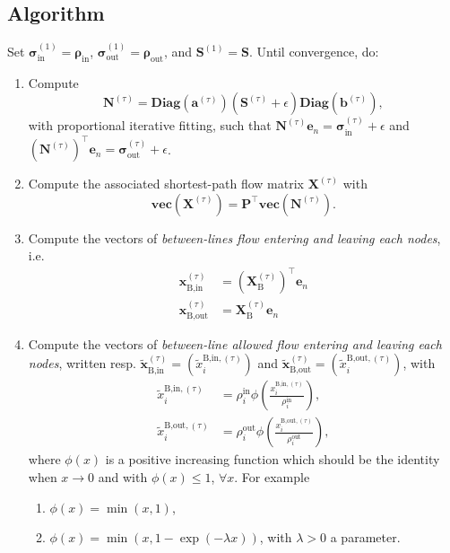 \documentclass[11p]{article}
\begin{document}
\subsection{Algorithm}
Set $\bm{\sigma}^{(1)}_\text{in} = \bm{\rho}_\text{in}$, $\bm{\sigma}^{(1)}_\text{out} = \bm{\rho}_\text{out}$, and $\mathbf{S}^{(1)} = \mathbf{S}$. Until convergence, do:
\begin{enumerate}
	\item Compute 
	\begin{equation}
		\mathbf{N}^{(\tau)} = \textbf{Diag}(\mathbf{a}^{(\tau)}) (\mathbf{S}^{(\tau)} + \epsilon)\textbf{Diag}(\mathbf{b}^{(\tau)}),
	\end{equation}
	with proportional iterative fitting, such that $\mathbf{N}^{(\tau)} \mathbf{e}_n = \bm{\sigma}^{(\tau)}_\text{in} + \epsilon$ and $\left(\mathbf{N}^{(\tau)}\right)^\top \mathbf{e}_n = \bm{\sigma}^{(\tau)}_\text{out}  + \epsilon$.
	
	\item Compute the associated shortest-path flow matrix $\mathbf{X}^{(\tau)}$ with
	\begin{equation}
		\textbf{vec}(\mathbf{X}^{(\tau)}) = \mathbf{P}^\top \textbf{vec}(\mathbf{N}^{(\tau)}).
	\end{equation}
	
	\item Compute the vectors of \emph{between-lines flow entering and leaving each nodes}, i.e.
	\begin{align}
		\mathbf{x}^{(\tau)}_\text{B,in} &= (\mathbf{X}^{(\tau)}_\text{B})^\top \mathbf{e}_n \\
		\mathbf{x}^{(\tau)}_\text{B,out} &= \mathbf{X}^{(\tau)}_\text{B} \mathbf{e}_n
	\end{align}

	\item Compute the vectors of \emph{between-line allowed flow entering and leaving each nodes}, written resp. $\tilde{\mathbf{x}}^{(\tau)}_\text{B,in} = (\tilde{x}^{\text{B,in},(\tau)}_i)$ and $\tilde{\mathbf{x}}^{(\tau)}_\text{B,out} = (\tilde{x}^{\text{B,out},(\tau)}_i)$, with 
	\begin{align}
		\tilde{x}^{\text{B,in},(\tau)}_i &= \rho_i^\text{in} \phi \left( \frac{x^{\text{B,in},(\tau)}_i}{\rho_i^\text{in}} \right), \\
		\tilde{x}^{\text{B,out},(\tau)}_i &= \rho_i^\text{out} \phi \left( \frac{x^{\text{B,out},(\tau)}_i}{\rho_i^\text{out}} \right),
	\end{align}
	where $\phi(x)$ is a positive increasing function which should be the identity when $x \to 0$ and with $\phi(x) \leq 1$, $\forall x$. For example
	\begin{enumerate}
		\item $\phi(x) = \min(x, 1)$,
		\item $\phi(x) = \min(x, 1 - \exp(-\lambda x))$, with $\lambda > 0$ a parameter.
	\end{enumerate}


\end{enumerate}
\end{document}
